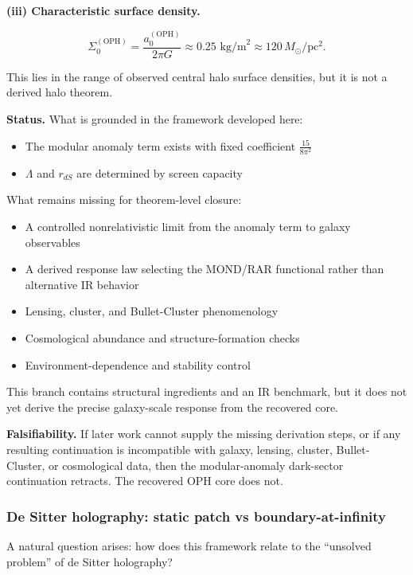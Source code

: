 \textbf{(iii) Characteristic surface density.}

\[
\Sigma_0^{\mathrm{(OPH)}} = \frac{a_0^{\mathrm{(OPH)}}}{2\pi G}
\approx 0.25 \text{ kg/m}^2 \approx 120 \, M_\odot/\text{pc}^2.
\]

This lies in the range of observed central halo surface densities, but it is not a derived halo theorem.

\textbf{Status.} What is grounded in the framework developed here:

\begin{itemize}
\tightlist
\item
  The modular anomaly term exists with fixed coefficient \(\frac{15}{8\pi^2}\)
\item
  \(\Lambda\) and \(r_{dS}\) are determined by screen capacity
\end{itemize}

What remains missing for theorem-level closure:

\begin{itemize}
\tightlist
\item
  A controlled nonrelativistic limit from the anomaly term to galaxy observables
\item
  A derived response law selecting the MOND/RAR functional rather than alternative IR behavior
\item
  Lensing, cluster, and Bullet-Cluster phenomenology
\item
  Cosmological abundance and structure-formation checks
\item
  Environment-dependence and stability control
\end{itemize}

This branch contains structural ingredients and an IR benchmark, but it does not yet derive the precise galaxy-scale response from the recovered core.

\textbf{Falsifiability.} If later work cannot supply the missing derivation steps, or if any resulting continuation is incompatible with galaxy, lensing, cluster, Bullet-Cluster, or cosmological data, then the modular-anomaly dark-sector continuation retracts. The recovered OPH core does not.

\subsubsection{De Sitter holography: static patch vs boundary-at-infinity}\label{516-de-sitter-holography-static-patch-vs-boundary-at-infinity}

A natural question arises: how does this framework relate to the ``unsolved problem'' of de Sitter holography?

